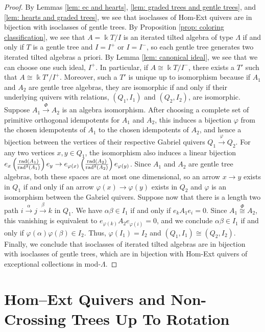 \documentclass[12pt]{amsart}
\theoremstyle{definition}
\theoremstyle{remark}
\numberwithin{equation}{section}
\newcommand{\kk}{\ensuremath{\Bbbk}}
\begin{document}
\begin{proof}
    By Lemmas \ref{lem: ec and hearts}, \ref{lem: graded trees and gentle trees}, and \ref{lem: hearts and graded trees}, we see that isoclasses of Hom-Ext quivers are in bijection with isoclasses of gentle trees. By Proposition \ref{prop: coloring classification}, we see that $A = \kk T/I$ is an iterated tilted algebra of type $\Lambda$ if and only if $T$ is a gentle tree and $I = I^+$ or $I=I^-$, so each gentle tree generates two iterated tilted algebras a priori. By Lemma \ref{lem: canonical ideal}, we see that we can choose one such ideal, $I^+$. In particular, if $A \cong \kk T/I^-$, there exists a $T'$ such that $A \cong \kk T'/I^+$. Moreover, such a $T'$ is unique up to isomorphism because if $A_1$ and $A_2$ are gentle tree algebras, they are isomorphic if and only if their underlying quivers with relations, $(Q_1,I_1)$ and $(Q_2,I_2)$, are isomorphic. {\color{black} Suppose $A_1 \overset{\Phi}{\rightarrow} A_2$ is an algebra isomorphism. After choosing a complete set of primitive orthogonal idempotents for $A_1$ and $A_2$, this induces a bijection $\varphi$ from the chosen idempotents of $A_1$ to the chosen idempotents of $A_2$, and hence a bijection between the vertices of their respective Gabriel quivers $Q_1 \overset{\varphi}{\rightarrow} Q_2$. For any two vertices $x,y\in Q_1$, the isomorphism also induces a linear bijection $e_x\left({\text{rad}(A_1)\over \text{rad}^2(A_1)}\right)e_y \rightarrow e_{\varphi(x)}\left({\text{rad}(A_2)\over \text{rad}^2(A_2)}\right)e_{\varphi(y)}$. Since $A_1$ and $A_2$ are gentle tree algebras, both these spaces are at most one dimensional, so an arrow $x\rightarrow y$ exists in $Q_1$ if and only if an arrow $\varphi(x)\rightarrow \varphi(y)$ exists in $Q_2$ and $\varphi$ is an isomorphism between the Gabriel quivers. Suppose now that there is a length two path $i \overset{\alpha}{\rightarrow} j \overset{\beta}{\rightarrow} k$ in $Q_1$. We have $\alpha\beta \in I_1$ if and only if $e_kA_1e_i = 0$. Since $A_1 \overset{\Phi}{\cong} A_2$, this vanishing is equivalent to $e_{\varphi(k)}A_2e_{\varphi(i)} = 0$, and we conclude $\alpha\beta \in I_1$ if and only if $\varphi(\alpha)\varphi(\beta)\in I_2$. Thus, $\varphi(I_1) = I_2$ and $(Q_1,I_1) \cong (Q_2,I_2)$.} Finally, we conclude that isoclasses of iterated tilted algebras are in bijection with isoclasses of gentle trees, which are in bijection with Hom-Ext quivers of exceptional collections in mod-$\Lambda$. 
\end{proof}

\section{Hom--Ext Quivers and Non-Crossing Trees Up To Rotation}\label{sec3}
\end{document}
